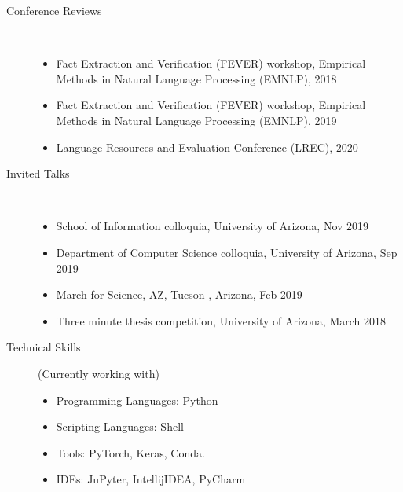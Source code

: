 \documentclass[10pt]{article}
\begin{document}
\begin{description}
\vspace{-.4cm}\item [Conference Reviews]\
\begin{itemize}
\itemsep-1em
\item Fact Extraction and Verification (FEVER) workshop, Empirical Methods in Natural Language Processing (EMNLP), 2018\\
\item Fact Extraction and Verification (FEVER) workshop, Empirical Methods in Natural Language Processing (EMNLP), 2019\\
\item Language Resources and Evaluation Conference (LREC), 2020\\

\end{itemize}




\newpage


\item [Invited Talks ]\
\begin{itemize}
\item School of Information colloquia, University of Arizona, Nov 2019
\item Department of Computer Science colloquia, University of Arizona, Sep 2019
\item March for Science, AZ, Tucson , Arizona, Feb 2019
\item Three minute thesis competition, University of Arizona, March 2018
\end{itemize}



\item [Technical Skills](Currently working with) \
\begin{itemize}
\itemsep0em
\item Programming Languages:  Python
\item Scripting Languages: Shell
\item Tools:  PyTorch, Keras, Conda.
\item IDEs: JuPyter,  IntellijIDEA, PyCharm
\end{itemize}



\end{description}
\end{document}
